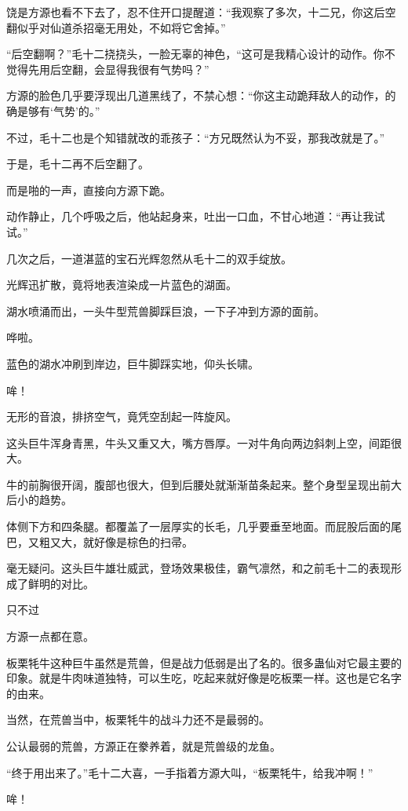 \begin{this_body}
饶是方源也看不下去了，忍不住开口提醒道：“我观察了多次，十二兄，你这后空翻似乎对仙道杀招毫无用处，不如将它舍掉。”

“后空翻啊？”毛十二挠挠头，一脸无辜的神色，“这可是我精心设计的动作。你不觉得先用后空翻，会显得我很有气势吗？”

方源的脸色几乎要浮现出几道黑线了，不禁心想：“你这主动跪拜敌人的动作，的确是够有‘气势’的。”

不过，毛十二也是个知错就改的乖孩子：“方兄既然认为不妥，那我改就是了。”

于是，毛十二再不后空翻了。

而是啪的一声，直接向方源下跪。

动作静止，几个呼吸之后，他站起身来，吐出一口血，不甘心地道：“再让我试试。”

几次之后，一道湛蓝的宝石光辉忽然从毛十二的双手绽放。

光辉迅扩散，竟将地表渲染成一片蓝色的湖面。

湖水喷涌而出，一头牛型荒兽脚踩巨浪，一下子冲到方源的面前。

哗啦。

蓝色的湖水冲刷到岸边，巨牛脚踩实地，仰头长啸。

哞！

无形的音浪，排挤空气，竟凭空刮起一阵旋风。

这头巨牛浑身青黑，牛头又重又大，嘴方唇厚。一对牛角向两边斜刺上空，间距很大。

牛的前胸很开阔，腹部也很大，但到后腰处就渐渐苗条起来。整个身型呈现出前大后小的趋势。

体侧下方和四条腿。都覆盖了一层厚实的长毛，几乎要垂至地面。而屁股后面的尾巴，又粗又大，就好像是棕色的扫帚。

毫无疑问。这头巨牛雄壮威武，登场效果极佳，霸气凛然，和之前毛十二的表现形成了鲜明的对比。

只不过

方源一点都在意。

板栗牦牛这种巨牛虽然是荒兽，但是战力低弱是出了名的。很多蛊仙对它最主要的印象。就是牛肉味道独特，可以生吃，吃起来就好像是吃板栗一样。这也是它名字的由来。

当然，在荒兽当中，板栗牦牛的战斗力还不是最弱的。

公认最弱的荒兽，方源正在豢养着，就是荒兽级的龙鱼。

“终于用出来了。”毛十二大喜，一手指着方源大叫，“板栗牦牛，给我冲啊！”

哞！


\end{this_body}
